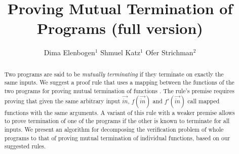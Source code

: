 \documentclass{llncs}
\newcommand\full[1]{#1}
\begin{document}
\title{Proving Mutual Termination of Programs \full{(full version)}}


\author{
Dima Elenbogen$^1$ \quad
Shmuel Katz$^1$\quad
Ofer Strichman$^2$
}

\newcommand\bpar[1]{{\bf #1} }

\maketitle

\begin{abstract}
Two programs are said to be \emph{mutually terminating} if they terminate on
exactly the same inputs. We suggest a proof rule that uses a mapping between the functions of the two programs for proving mutual
termination of functions . The rule's premise requires proving that given the same
arbitrary input $\vec{in}$, $f(\vec{in})$ and $f'(\vec{in})$ call mapped functions with the same
arguments. A variant of this rule with a weaker premise allows to prove
termination of one of the programs if the other is known to terminate for all
inputs. We present an algorithm for decomposing the verification problem of
whole programs to that of proving mutual termination of individual functions,
based on our suggested rules.
\end{abstract}




%




\appendix

\end{document}
